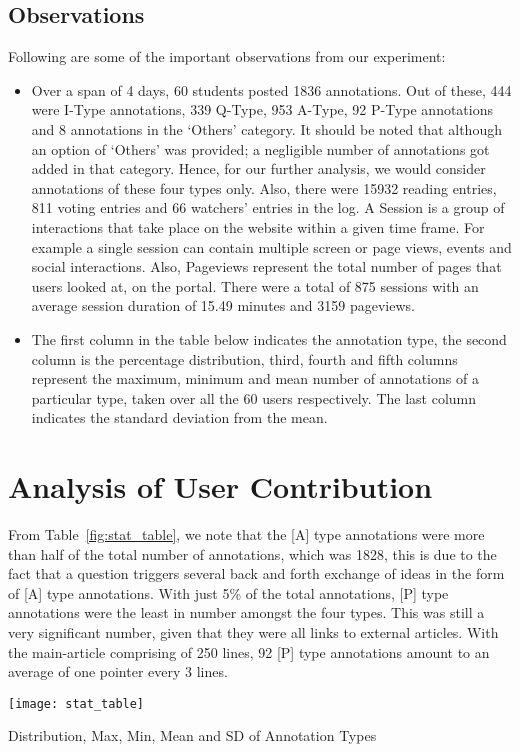 \documentclass{llncs}
\begin{document}
\subsection{Observations}
Following are some of the important observations from our experiment:
\begin{itemize}
\item Over a span of 4 days, 60 students posted 1836 annotations. Out of these, 444 were I-Type annotations, 339 Q-Type, 953 A-Type, 92 P-Type annotations and 8 annotations in the `Others' category. It should be noted that although an option of `Others' was provided; a negligible number of annotations got added in that category. Hence, for our further analysis, we would consider annotations of these four types only. Also, there were 15932 reading entries, 811 voting entries and 66 watchers' entries in the log. A Session is a group of interactions that take place on the website within a given time frame. For example a single session can contain multiple screen or page views, events and social interactions. Also, Pageviews represent the total number of pages that users looked at, on the portal. There were a total of 875 sessions with an average session duration of 15.49 minutes and 3159 pageviews.
\item The first column in the table below indicates the annotation type, the second column is the percentage distribution, third, fourth and fifth columns represent the maximum, minimum and mean number of annotations of a particular type, taken over all the 60 users respectively. The last column indicates the standard deviation from the mean.
\end{itemize}

\section{Analysis of User Contribution}
From Table~\ref{fig:stat_table}, we note that the [A] type annotations were more than half of the total number of annotations, which was 1828, this is due to the fact that a question triggers several back and forth exchange of ideas in the form of [A] type annotations. With just 5\% of the total annotations, [P] type annotations were the least in number amongst the four types. This was still a very significant number, given that they were all links to external articles. With the main-article comprising of 250 lines, 92 [P] type annotations amount to an average of one pointer every 3 lines.
\begin{table}
\centering
\texttt{[image: stat\_table]}
\caption{Distribution, Max, Min, Mean and SD of Annotation Types}
\label{fig:stat_table}
\end{table}
\end{document}
